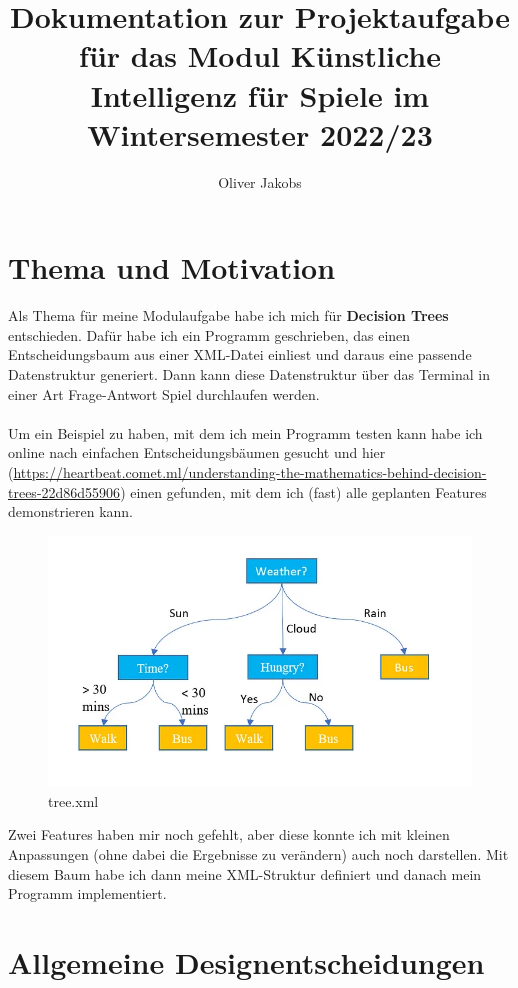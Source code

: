 \documentclass[a4paper,12pt]{article}
\title{Dokumentation zur Projektaufgabe für das Modul Künstliche Intelligenz für Spiele im Wintersemester 2022/23}
\author{Oliver Jakobs}
\begin{document}
\maketitle

\section*{Thema und Motivation}

Als Thema für meine Modulaufgabe habe ich mich für \textbf{Decision Trees} entschieden. Dafür habe ich ein Programm geschrieben, das einen Entscheidungsbaum aus einer XML-Datei einliest und daraus eine passende Datenstruktur generiert. Dann kann diese Datenstruktur über das Terminal in einer Art Frage-Antwort Spiel durchlaufen werden.
\\
\\
Um ein Beispiel zu haben, mit dem ich mein Programm testen kann habe ich online nach einfachen Entscheidungsbäumen gesucht und hier (\url{https://heartbeat.comet.ml/understanding-the-mathematics-behind-decision-trees-22d86d55906}) einen gefunden, mit dem ich (fast) alle geplanten Features demonstrieren kann. 

\begin{figure}[h]
	\centering
	\includegraphics[width=\linewidth]{tree.png}
	\caption{tree.xml}
\end{figure}

Zwei Features haben mir noch gefehlt, aber diese konnte ich mit kleinen Anpassungen (ohne dabei die Ergebnisse zu verändern) auch noch darstellen.
Mit diesem Baum habe ich dann meine XML-Struktur definiert und danach mein Programm implementiert. 

\newpage

\section*{Allgemeine Designentscheidungen}
\end{document}

